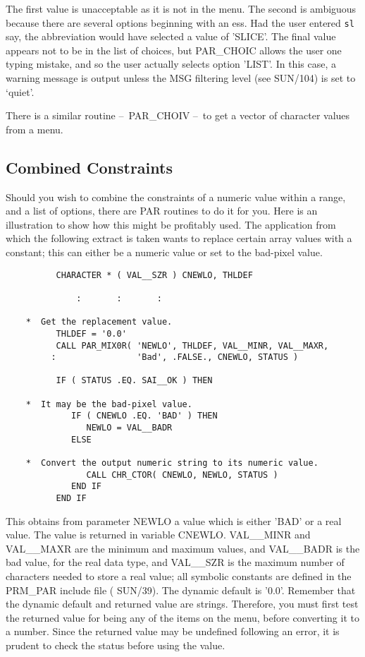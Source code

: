 \documentclass[twoside,11pt]{article}
\newcommand{\xref}[3]{#1}
\newcommand{\xlabel}[1]{}
\newcommand{\latex}[1]{#1}
\newcommand{\dash}{--}
\newcommand{\dash}{-}
\begin{document}
The first value is unacceptable as it is not in the menu.  The second is
ambiguous because there are several options beginning with an ess. Had
the user entered {\tt sl} say, the abbreviation would have selected a
value of 'SLICE'. The final value appears not to be in the list of
choices, but PAR\_CHOIC allows the user one typing mistake, and so the
user actually selects option 'LIST'. In this case, a warning message is output
unless the
\xref{MSG filtering level}{sun104}{conditional_message_reporting}
\latex{ (see SUN/104)} is set to `quiet'.

There is a similar routine \dash\ PAR\_CHOIV \dash\ to get a vector of character
values from a menu.

\subsection{\xlabel{combined_constraints}Combined Constraints}

Should you wish to combine the constraints of a numeric value within a
range, and a list of options, there are PAR routines to do it for you.
Here is an illustration to show how this might be profitably used.  The
application from which the following extract is taken wants to replace
certain array values with a constant; this can either be a numeric value
or set to the bad-pixel value. 

\begin{verbatim}
          CHARACTER * ( VAL__SZR ) CNEWLO, THLDEF

              :       :       :

    *  Get the replacement value.
          THLDEF = '0.0'
          CALL PAR_MIX0R( 'NEWLO', THLDEF, VAL__MINR, VAL__MAXR,
         :                'Bad', .FALSE., CNEWLO, STATUS )

          IF ( STATUS .EQ. SAI__OK ) THEN

    *  It may be the bad-pixel value.
             IF ( CNEWLO .EQ. 'BAD' ) THEN
                NEWLO = VAL__BADR
             ELSE

    *  Convert the output numeric string to its numeric value.
                CALL CHR_CTOR( CNEWLO, NEWLO, STATUS )
             END IF
          END IF
\end{verbatim}

This obtains from parameter NEWLO a value which is either 'BAD' or a
real value.  The value is returned in variable CNEWLO.  VAL\_\_MINR and
VAL\_\_MAXR are the minimum and maximum values, and VAL\_\_BADR is the
bad value, for the real data type, and VAL\_\_SZR is the maximum number
of characters needed to store a real value; all symbolic constants are
defined in the PRM\_PAR include file (
\xref{SUN/39}{sun39}{}).
 The dynamic default is
'0.0'. Remember that the dynamic default and returned value are
strings.  Therefore, you must first test the returned value for being any
of the items on the menu, before converting it to a number.  Since the
returned value may be undefined following an error, it is prudent to
check the status before using the value. 
\end{document}
